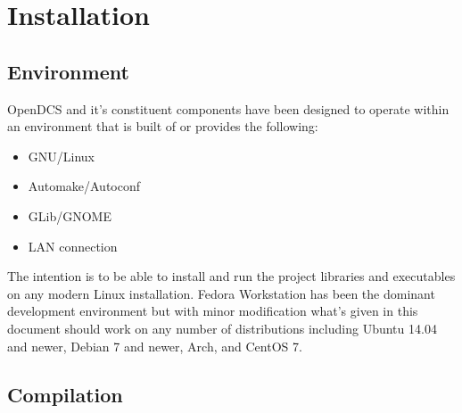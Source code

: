 \section{Installation}\label{sec:inst}

  \subsection{Environment}\label{sec:inst-env}

    OpenDCS and it's constituent components have been designed to operate
    within an environment that is built of or provides the following:

    \begin{itemize}
      \item GNU/Linux
      \item Automake/Autoconf
      \item GLib/GNOME
      \item LAN connection
    \end{itemize}

    The intention is to be able to install and run the project libraries and
    executables on any modern Linux installation. Fedora Workstation has been
    the dominant development environment but with minor modification what's
    given in this document should work on any number of distributions including
    Ubuntu 14.04 and newer, Debian 7 and newer, Arch, and CentOS 7.

  \subsection{Compilation}\label{sec:inst-comp}

